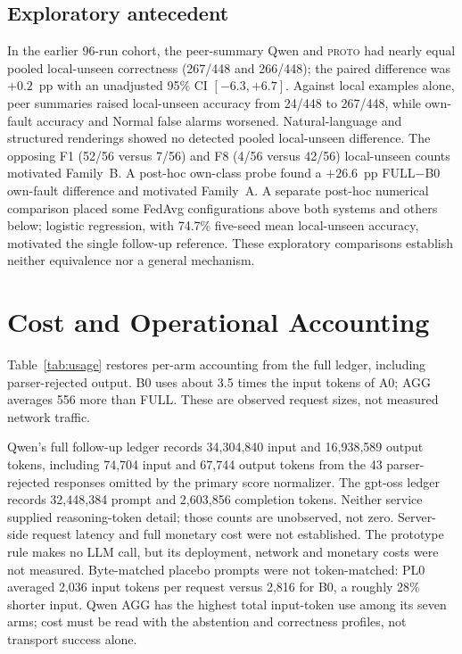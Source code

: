 \documentclass[conference]{IEEEtran}
\newcommand{\PROTO}{\textsc{proto}}
\newcommand{\cond}[1]{\textsf{#1}}
\begin{document}
\subsection{Exploratory antecedent}
In the earlier 96-run cohort, the peer-summary Qwen and \PROTO{} had nearly equal pooled local-unseen correctness (267/448 and 266/448); the paired difference was $+0.2$~pp with an unadjusted 95\% CI $[-6.3,+6.7]$. Against local examples alone, peer summaries raised local-unseen accuracy from 24/448 to 267/448, while own-fault accuracy and Normal false alarms worsened. Natural-language and structured renderings showed no detected pooled local-unseen difference. The opposing F1 (52/56 versus 7/56) and F8 (4/56 versus 42/56) local-unseen counts motivated Family~B. A post-hoc own-class probe found a $+26.6$~pp \cond{FULL}$-$\cond{B0} own-fault difference and motivated Family~A. A separate post-hoc numerical comparison placed some FedAvg configurations above both systems and others below; logistic regression, with 74.7\% five-seed mean local-unseen accuracy, motivated the single follow-up reference. These exploratory comparisons establish neither equivalence nor a general mechanism.


\section{Cost and Operational Accounting}
\label{sec:cost}
Table~\ref{tab:usage} restores per-arm accounting from the full ledger, including parser-rejected output. \cond{B0} uses about 3.5 times the input tokens of \cond{A0}; \cond{AGG} averages 556 more than \cond{FULL}. These are observed request sizes, not measured network traffic.

\begin{table}[t]
\centering\footnotesize
\caption{Qwen mean tokens per request, rounded to integers, including all 2,048 requests per arm and all terminal states. Reasoning-token detail was not reported.}
\label{tab:usage}
\setlength{\tabcolsep}{7pt}

\end{table}

Qwen's full follow-up ledger records 34,304,840 input and 16,938,589 output tokens, including 74,704 input and 67,744 output tokens from the 43 parser-rejected responses omitted by the primary score normalizer. The gpt-oss ledger records 32,448,384 prompt and 2,603,856 completion tokens. Neither service supplied reasoning-token detail; those counts are unobserved, not zero. Server-side request latency and full monetary cost were not established. The prototype rule makes no LLM call, but its deployment, network and monetary costs were not measured. Byte-matched placebo prompts were not token-matched: \cond{PL0} averaged 2,036 input tokens per request versus 2,816 for \cond{B0}, a roughly 28\% shorter input. Qwen \cond{AGG} has the highest total input-token use among its seven arms; cost must be read with the abstention and correctness profiles, not transport success alone.
\end{document}
